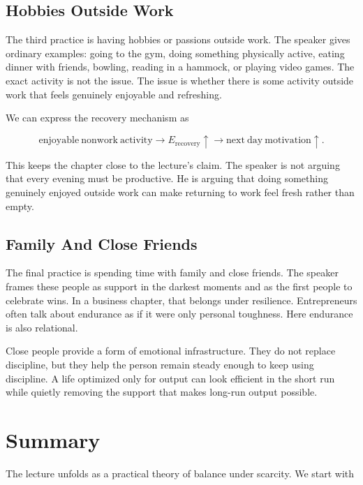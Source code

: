 \subsection{Hobbies Outside Work}

The third practice is having hobbies or passions outside work. The speaker gives ordinary examples: going to the gym, doing something physically active, eating dinner with friends, bowling, reading in a hammock, or playing video games. The exact activity is not the issue. The issue is whether there is some activity outside work that feels genuinely enjoyable and refreshing.

We can express the recovery mechanism as

\begin{equation}
\mathrm{enjoyable\ nonwork\ activity}
\longrightarrow
E_{\mathrm{recovery}} \uparrow
\longrightarrow
\mathrm{next\ day\ motivation} \uparrow .
\end{equation}

This keeps the chapter close to the lecture's claim. The speaker is not arguing that every evening must be productive. He is arguing that doing something genuinely enjoyed outside work can make returning to work feel fresh rather than empty.

\subsection{Family And Close Friends}

The final practice is spending time with family and close friends. The speaker frames these people as support in the darkest moments and as the first people to celebrate wins. In a business chapter, that belongs under resilience. Entrepreneurs often talk about endurance as if it were only personal toughness. Here endurance is also relational.

Close people provide a form of emotional infrastructure. They do not replace discipline, but they help the person remain steady enough to keep using discipline. A life optimized only for output can look efficient in the short run while quietly removing the support that makes long-run output possible.

\section{Summary}

The lecture unfolds as a practical theory of balance under scarcity. We start with

